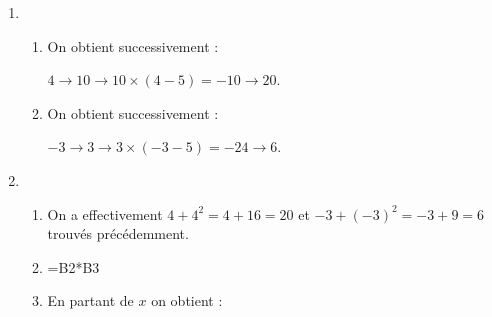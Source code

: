 \begin{enumerate}
\item 
	\begin{enumerate}
		\item %
On obtient successivement :
		
$4 \to 10 \to 10 \times (4 - 5) = -10 \to 20$.
		\item %
On obtient successivement :
		
$- 3 \to 3 \to 3 \times (-3 - 5) = -24 \to 6$.
	\end{enumerate}
\item %
	\begin{enumerate}
		\item %
On a effectivement $4 + 4^2 = 4 + 16 = 20$ et $- 3 + (- 3)^2 = - 3 + 9 = 6$ trouvés précédemment.
		\item  %

%
%
=B2*B3
		\item  %
En partant de $x$ on obtient :


\end{enumerate}
\end{enumerate}
